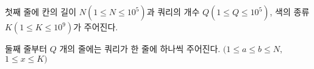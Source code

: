 첫째 줄에 칸의 길이 $N(1≤N≤10^5)$과 쿼리의 개수 $Q(1≤Q≤10^5)$, 색의 종류 $K(1≤K≤10^9)$가 주어진다. 

둘째 줄부터 $Q$ 개의 줄에는 쿼리가 한 줄에 하나씩 주어진다. $(1≤a≤b≤N,$ $1≤x≤K)$
